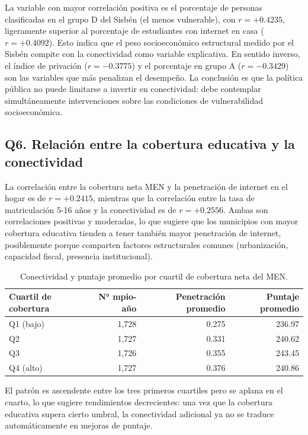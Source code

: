 La variable con mayor correlación positiva es el porcentaje de personas clasificadas en el grupo D del Sisbén (el menos vulnerable), con $r = +0.4235$, ligeramente superior al porcentaje de estudiantes con internet en casa ($r = +0.4092$). Esto indica que el peso socioeconómico estructural medido por el Sisbén compite con la conectividad como variable explicativa. En sentido inverso, el índice de privación ($r = -0.3775$) y el porcentaje en grupo A ($r = -0.3429$) son las variables que más penalizan el desempeño. La conclusión es que la política pública no puede limitarse a invertir en conectividad: debe contemplar simultáneamente intervenciones sobre las condiciones de vulnerabilidad socioeconómica.

\subsection{Q6. Relación entre la cobertura educativa y la conectividad}
La correlación entre la cobertura neta MEN y la penetración de internet en el hogar es de $r = +0.2415$, mientras que la correlación entre la tasa de matriculación 5-16 años y la conectividad es de $r = +0.2556$. Ambas son correlaciones positivas y moderadas, lo que sugiere que los municipios con mayor cobertura educativa tienden a tener también mayor penetración de internet, posiblemente porque comparten factores estructurales comunes (urbanización, capacidad fiscal, presencia institucional).

\begin{table}[H]
\centering
\caption{Conectividad y puntaje promedio por cuartil de cobertura neta del MEN.}
\begin{tabular}{l r r r}
\toprule
\textbf{Cuartil de cobertura} & \textbf{N° mpio-año} & \textbf{Penetración promedio} & \textbf{Puntaje promedio} \\
\midrule
Q1 (bajo)  & 1,728 & 0.275 & 236.97 \\
Q2         & 1,727 & 0.331 & 240.62 \\
Q3         & 1,726 & 0.355 & 243.45 \\
Q4 (alto)  & 1,727 & 0.376 & 240.86 \\
\bottomrule
\end{tabular}
\end{table}

El patrón es ascendente entre los tres primeros cuartiles pero se aplana en el cuarto, lo que sugiere rendimientos decrecientes: una vez que la cobertura educativa supera cierto umbral, la conectividad adicional ya no se traduce automáticamente en mejoras de puntaje.

